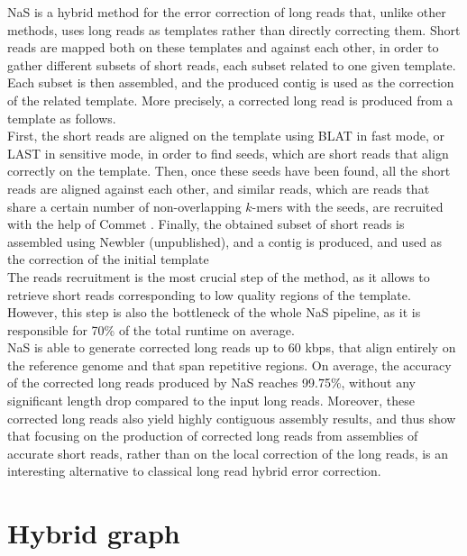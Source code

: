\documentclass[long, final]{jobim2017}
\begin{document}
NaS is a hybrid method for the error correction of long reads that, unlike other methods, uses long reads as templates rather than directly correcting them. Short reads are mapped both on these templates and against each other, in order to gather different subsets of short reads, each subset related to one given template. Each subset is then assembled, and the produced contig is used as the correction of the related template. More precisely, a corrected long read is produced from a template as follows. \\
\indent First, the short reads are aligned on the template using BLAT \cite{Kent2002} in fast mode, or LAST \cite{Kielbasa2011} in sensitive mode, in order to find seeds, which are short reads that align correctly on the template. Then, once these seeds have been found, all the short reads are aligned against each other, and similar reads, which are reads that share a certain number of non-overlapping $k$-mers with the seeds, are recruited with the help of Commet \cite{Maillet2014}. Finally, the obtained subset of short reads is assembled using Newbler (unpublished), and a contig is produced, and used as the correction of the initial template \\ 
\indent The reads recruitment is the most crucial step of the method, as it allows to retrieve short reads corresponding to low quality
regions of the template. However, this step is also the bottleneck of the whole NaS pipeline, as it is responsible for 70\% of the
total runtime on average. \\
\indent NaS is able to generate corrected long reads up to 60 kbps, that align entirely on the reference genome and that span repetitive regions. On average, the accuracy of the corrected long reads produced by NaS reaches 99.75\%, without any significant length drop compared to the input long reads. Moreover, these corrected long reads also yield highly contiguous assembly results, and thus show that focusing on the production of corrected
long reads from assemblies of accurate short reads, rather than on the local correction of the long reads, is an interesting alternative to classical long read hybrid error correction.

\section{Hybrid graph}
\label{sec:HG}
\end{document}
